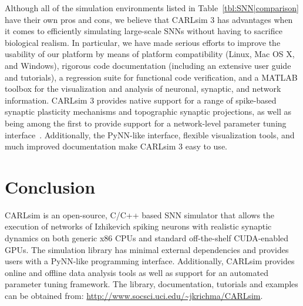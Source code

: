 Although all of the simulation environments listed in
Table~\ref{tbl:SNN|comparison} have their own pros and cons,
we believe that CARLsim 3 has advantages when it comes to
efficiently simulating large-scale \acp{SNN} without
having to sacrifice biological realism.
In particular, we have made serious efforts to improve the
usability of our platform by means of platform compatibility
(Linux, Mac OS X, and Windows),
rigorous code documentation
(including an extensive user guide and tutorials),
a regression suite for functional code verification,
and a MATLAB toolbox for the visualization and analysis
of neuronal, synaptic, and network information.
CARLsim 3 provides native support for a range of spike-based synaptic
plasticity mechanisms and topographic synaptic projections,
as well as being among the first to provide support for a
network-level parameter tuning interface~\citep{Carlson2014b}.
Additionally, the PyNN-like interface, flexible visualization tools,
and much improved documentation make CARLsim 3 easy to use.



\section{Conclusion}

CARLsim is an open-source, C/C++ based \ac{SNN} simulator that allows the
execution of networks of Izhikevich spiking neurons with realistic synaptic
dynamics on both generic x86 \acp{CPU} and standard off-the-shelf 
\ac{CUDA}-enabled \acp{GPU}.
The simulation library has minimal external dependencies and provides users
with a PyNN-like programming interface.
Additionally, CARLsim provides online and offline data analysis tools
as well as support for an automated parameter tuning framework.
The library, documentation, tutorials and examples can be obtained from:
\url{http://www.socsci.uci.edu/~jkrichma/CARLsim}.

